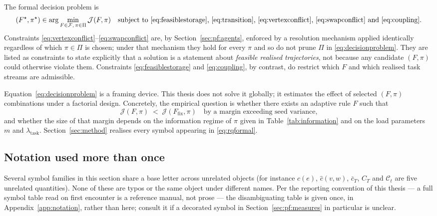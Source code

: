 \documentclass[../main.tex]{subfiles}
\begin{document}
The formal decision problem is
\begin{equation}
  (F^{\star}, \pi^{\star}) \in
  \arg\min_{F \in \mathcal{F},\, \pi \in \Pi} \mathcal{J}(F,\pi)
  \quad \text{subject to \eqref{eq:feasiblestorage}, \eqref{eq:transition},
  \eqref{eq:vertexconflict}, \eqref{eq:swapconflict} and \eqref{eq:coupling}.}
  \label{eq:decisionproblem}
\end{equation}
Constraints \eqref{eq:vertexconflict}--\eqref{eq:swapconflict} are, by %
Section~\ref{sec:pf:agents}, enforced by a resolution mechanism applied
identically regardless of which $\pi \in \Pi$ is chosen; under that mechanism
they hold for every $\pi$ and so do not prune $\Pi$ in
\eqref{eq:decisionproblem}. They are listed as constraints to state explicitly
that a solution is a statement about \emph{feasible realised trajectories}, not
because any candidate $(F,\pi)$ could otherwise violate them. Constraints
\eqref{eq:feasiblestorage} and \eqref{eq:coupling}, by contrast, do restrict which
$F$ and which realised task streams are admissible.

Equation~\eqref{eq:decisionproblem} is a framing device. This thesis does not
solve it globally; it estimates the effect of selected $(F,\pi)$ combinations
under a factorial design. Concretely, the empirical question is whether there
exists an adaptive rule $F$ such that
\begin{equation}
  \mathcal{J}(F, \pi) \;<\; \mathcal{J}(F_{\mathrm{fix}}, \pi)
  \quad \text{by a margin exceeding seed variance,}
  \label{eq:rqformal}
\end{equation}
and whether the size of that margin depends on the information regime of $\pi$
given in Table~\ref{tab:information} and on the load parameters $m$ and
$\lambda_{\mathrm{task}}$. Section~\ref{sec:method} realises every symbol
appearing in \eqref{eq:rqformal}.

\subsection{Notation used more than once}
\label{sec:pf:notation}

Several symbol families in this section share a base letter across unrelated %
objects (for instance $c(e)$, $\hat c(v,w)$, $\bar c_T$, $C_T$ and
$\mathcal{C}_t$ are five unrelated quantities). None of these are typos or the
same object under different names. Per the reporting convention of this thesis
--- a full symbol table read on first encounter is a reference manual, not
prose --- the disambiguating table is given once, in
Appendix~\ref{app:notation}, rather than here; consult it if a decorated symbol
in Section~\ref{sec:pf:measures} in particular is unclear.
\end{document}

